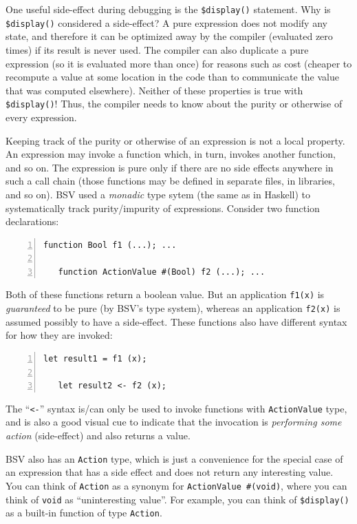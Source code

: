 One useful side-effect during debugging is the {\tt \$display()}
statement.  Why is {\tt \$display()} considered a side-effect?  A pure
expression does not modify any state, and therefore it can be
optimized away by the compiler (evaluated zero times) if its result is
never used.  The compiler can also duplicate a pure expression (so it
is evaluated more than once) for reasons such as cost (cheaper to
recompute a value at some location in the code than to communicate the
value that was computed elsewhere).  Neither of these properties is
true with {\tt \$display()}!  Thus, the compiler needs to know about
the purity or otherwise of every expression.

Keeping track of the purity or otherwise of an expression is not a
local property.  An expression may invoke a function which, in turn,
invokes another function, and so on.  The expression is pure only if
there are no side effects anywhere in such a call chain (those
functions may be defined in separate files, in libraries, and so on).
BSV used a \emph{monadic} type sytem (the same as in Haskell) to
systematically track purity/impurity of expressions.  Consider two
function declarations:


{\small
\begin{Verbatim}[frame=single, numbers=left]
   function Bool f1 (...); ...

   function ActionValue #(Bool) f2 (...); ...
\end{Verbatim}
}

Both of these functions return a boolean value.  But an application
{\tt f1(x)} is \emph{guaranteed} to be pure (by BSV's type system),
whereas an application {\tt f2(x)} is assumed possibly to have a
side-effect.  These functions also have different syntax for how they
are invoked:

{\small
\begin{Verbatim}[frame=single, numbers=left]
   let result1 = f1 (x);

   let result2 <- f2 (x);
\end{Verbatim}
}

The ``\verb|<-|'' syntax is/can only be used to invoke functions with
\verb|ActionValue| type, and is also a good visual cue to indicate
that the invocation is \emph{performing some action} (side-effect) and
also returns a value.

BSV also has an \verb|Action| type, which is just a convenience for
the special case of an expression that has a side effect and does not
return any interesting value.  You can think of \verb|Action| as a
synonym for \verb|ActionValue #(void)|, where you can think of
\verb|void| as ``uninteresting value''.  For example, you can think of
\verb|$display()| as a built-in function of type \verb|Action|.

